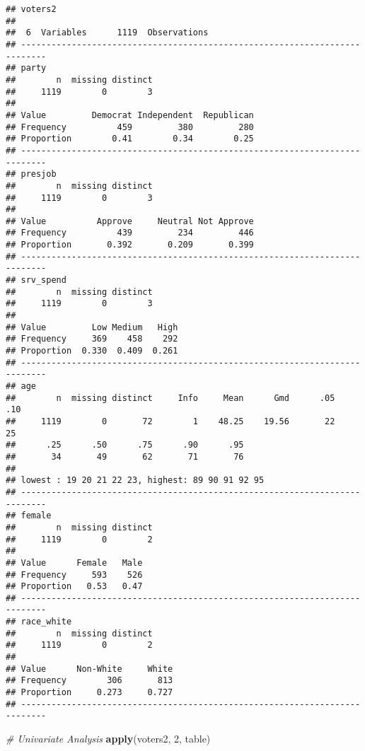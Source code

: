 \documentclass[]{article}
\newenvironment{Shaded}{\begin{snugshade}}{\end{snugshade}}
\newcommand{\KeywordTok}[1]{\textcolor[rgb]{0.13,0.29,0.53}{\textbf{{#1}}}}
\newcommand{\DecValTok}[1]{\textcolor[rgb]{0.00,0.00,0.81}{{#1}}}
\newcommand{\CommentTok}[1]{\textcolor[rgb]{0.56,0.35,0.01}{\textit{{#1}}}}
\newcommand{\NormalTok}[1]{{#1}}
\begin{document}
\begin{verbatim}
## voters2 
## 
##  6  Variables      1119  Observations
## ---------------------------------------------------------------------------
## party 
##        n  missing distinct 
##     1119        0        3 
##                                               
## Value         Democrat Independent  Republican
## Frequency          459         380         280
## Proportion        0.41        0.34        0.25
## ---------------------------------------------------------------------------
## presjob 
##        n  missing distinct 
##     1119        0        3 
##                                               
## Value          Approve     Neutral Not Approve
## Frequency          439         234         446
## Proportion       0.392       0.209       0.399
## ---------------------------------------------------------------------------
## srv_spend 
##        n  missing distinct 
##     1119        0        3 
##                                
## Value         Low Medium   High
## Frequency     369    458    292
## Proportion  0.330  0.409  0.261
## ---------------------------------------------------------------------------
## age 
##        n  missing distinct     Info     Mean      Gmd      .05      .10 
##     1119        0       72        1    48.25    19.56       22       25 
##      .25      .50      .75      .90      .95 
##       34       49       62       71       76 
## 
## lowest : 19 20 21 22 23, highest: 89 90 91 92 95
## ---------------------------------------------------------------------------
## female 
##        n  missing distinct 
##     1119        0        2 
##                         
## Value      Female   Male
## Frequency     593    526
## Proportion   0.53   0.47
## ---------------------------------------------------------------------------
## race_white 
##        n  missing distinct 
##     1119        0        2 
##                               
## Value      Non-White     White
## Frequency        306       813
## Proportion     0.273     0.727
## ---------------------------------------------------------------------------
\end{verbatim}

\begin{Shaded}
\begin{Highlighting}[]
\CommentTok{# Univariate Analysis}
\KeywordTok{apply}\NormalTok{(voters2, }\DecValTok{2}\NormalTok{, table)}
\end{Highlighting}
\end{Shaded}
\end{document}
